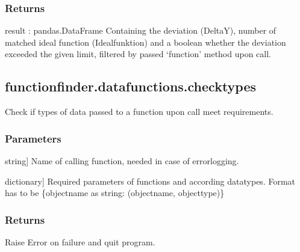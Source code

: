 \documentclass[letterpaper,10pt,english]{sphinxmanual}
\begin{document}
\begin{fulllineitems}
\begin{description}
\end{description}


\subsubsection{Returns}
\label{\detokenize{_autosummary/functionfinder.datafunctions.calculate_best_ideal:returns}}
\sphinxAtStartPar
result : pandas.DataFrame
Containing the deviation (DeltaY), number of matched ideal function
(Idealfunktion) and a boolean whether the deviation exceeded the given
limit, filtered by passed ‘function’ method upon call.

\end{fulllineitems}


\sphinxstepscope


\subsection{functionfinder.datafunctions.checktypes}
\label{\detokenize{_autosummary/functionfinder.datafunctions.checktypes:functionfinder-datafunctions-checktypes}}\label{\detokenize{_autosummary/functionfinder.datafunctions.checktypes::doc}}

\begin{fulllineitems}
\label{\detokenize{_autosummary/functionfinder.datafunctions.checktypes:functionfinder.datafunctions.checktypes}}
\pysigstartsignatures
{}
\pysigstopsignatures
\sphinxAtStartPar
Check if types of data passed to a function upon call meet requirements.


\subsubsection{Parameters}
\label{\detokenize{_autosummary/functionfinder.datafunctions.checktypes:parameters}}\begin{description}
\sphinxlineitem{functionname}{[}string{]}
\sphinxAtStartPar
Name of calling function, needed in case of error\sphinxhyphen{}logging.

\sphinxlineitem{typedict}{[}dictionary{]}
\sphinxAtStartPar
Required parameters of functions and according datatypes. Format has
to be \{object\sphinxhyphen{}name as string: (object\sphinxhyphen{}name, object\sphinxhyphen{}type)\}

\end{description}


\subsubsection{Returns}
\label{\detokenize{_autosummary/functionfinder.datafunctions.checktypes:returns}}
\sphinxAtStartPar
Raise Error on failure and quit program.

\end{fulllineitems}
\end{document}

